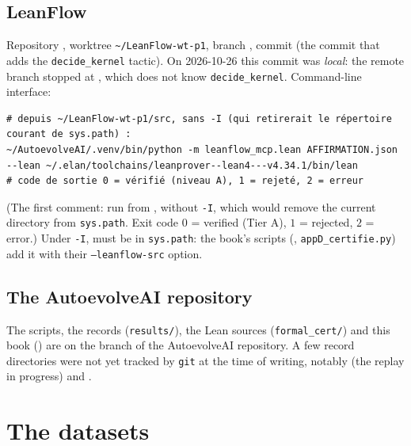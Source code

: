\subsection{LeanFlow}
Repository , worktree
\texttt{\~{}/LeanFlow-wt-p1}, branch , commit
 (the commit that adds the \texttt{decide\_kernel} tactic). On
2026-10-26 this commit was \emph{local}: the remote branch stopped at
, which does not know \texttt{decide\_kernel}. Command-line interface:
\begin{lstlisting}[style=appC,language={}]
# depuis ~/LeanFlow-wt-p1/src, sans -I (qui retirerait le répertoire courant de sys.path) :
~/AutoevolveAI/.venv/bin/python -m leanflow_mcp.lean AFFIRMATION.json --lean ~/.elan/toolchains/leanprover--lean4---v4.34.1/bin/lean
# code de sortie 0 = vérifié (niveau A), 1 = rejeté, 2 = erreur
\end{lstlisting}
(The first comment: run from , without \texttt{-I},
which would remove the current directory from \texttt{sys.path}. Exit code $0$ = verified (Tier A), $1$ = rejected, $2$ = error.) Under \texttt{-I},  must be
in \texttt{sys.path}: the book's scripts (, \texttt{appD\_certifie.py}) add it with their
\texttt{--leanflow-src} option.

\subsection{The AutoevolveAI repository}
The scripts, the records (\texttt{results/}), the Lean sources (\texttt{formal\_cert/}) and this book
() are on the branch  of the
AutoevolveAI repository. A few record directories were not yet tracked by \texttt{git} at the time of writing, notably
 (the  replay in progress) and
.

\section{The datasets}\label{appE:sec:donnees}

